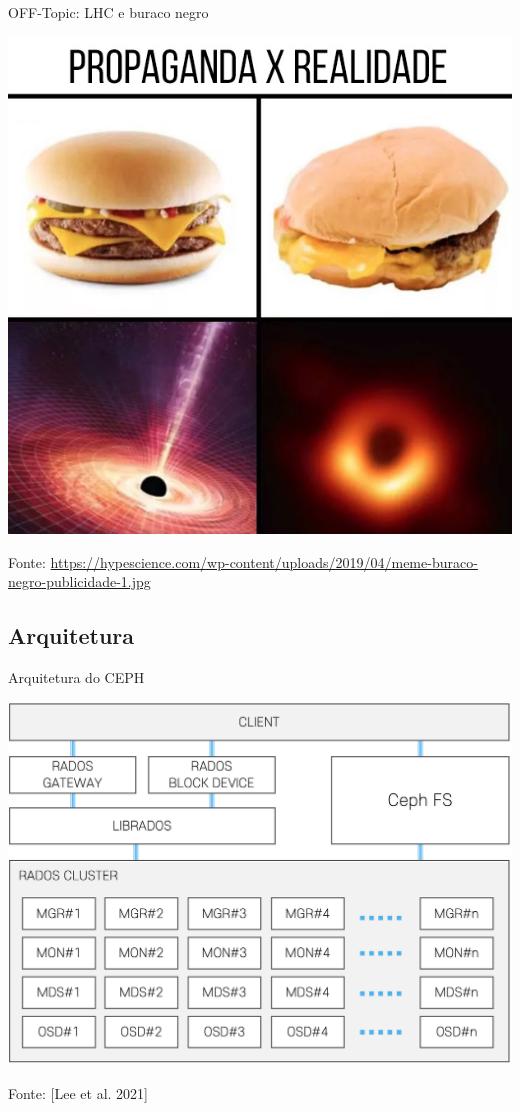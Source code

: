 \documentclass[xcolor=dvipsnames,table]{beamer}
\begin{document}
\begin{frame}{OFF-Topic: LHC e buraco negro}
	\begin{center}
		\includegraphics[scale=0.25]{buraco-negro-3.jpg}
	\end{center}
	Fonte: \url{https://hypescience.com/wp-content/uploads/2019/04/meme-buraco-negro-publicidade-1.jpg}
\end{frame}

\subsection{Arquitetura}
\begin{frame}{Arquitetura do CEPH}
	\begin{center}
		\includegraphics[scale=0.125]{ceph1.png}
	\end{center}
	Fonte: [Lee et al. 2021]
\end{frame}
\end{document}
